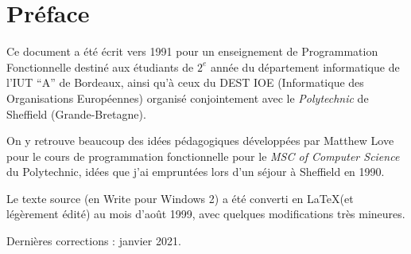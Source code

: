 \chapter*{Préface}


Ce document a été écrit vers 1991 pour un enseignement de Programmation
Fonctionnelle destiné aux étudiants de $2^e$ année du département informatique
de l'IUT ``A'' de Bordeaux, ainsi qu'à ceux du DEST IOE (Informatique des
Organisations Européennes) organisé conjointement avec le
\emph{Polytechnic} de Sheffield (Grande-Bretagne).

On y retrouve beaucoup des idées pédagogiques développées par Matthew
Love pour le cours de programmation fonctionnelle pour le \emph{MSC of
Computer Science} du Polytechnic, idées que j'ai empruntées lors d'un
séjour à Sheffield en 1990.

Le texte source (en Write pour Windows 2) a été converti en \LaTeX (et
légèrement édité) au mois d'août 1999, avec quelques modifications
très mineures.

Dernières corrections : janvier 2021.






